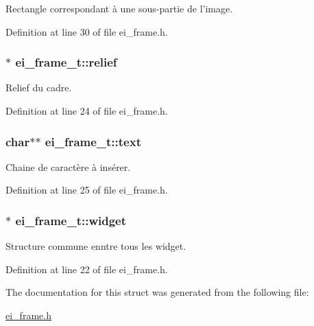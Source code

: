 Rectangle correspondant à une sous-\/partie de l'image. 



Definition at line 30 of file ei\-\_\-frame.\-h.

\hypertarget{structei__frame__t_ae547648681fd8fdf017041d60387ab3d}{
\subsubsection[{relief}]{$\ast$ ei\-\_\-frame\-\_\-t\-::relief}}\label{structei__frame__t_ae547648681fd8fdf017041d60387ab3d}


Relief du cadre. 



Definition at line 24 of file ei\-\_\-frame.\-h.

\hypertarget{structei__frame__t_a17c0d110f2f3fe98e566d7ac3769786b}{
\subsubsection[{text}]{\setlength{\rightskip}{0pt plus 5cm}char$\ast$$\ast$ ei\-\_\-frame\-\_\-t\-::text}}\label{structei__frame__t_a17c0d110f2f3fe98e566d7ac3769786b}


Chaine de caractère à insérer. 



Definition at line 25 of file ei\-\_\-frame.\-h.

\hypertarget{structei__frame__t_abf750a1ddbd97ebb9c641396205aab2e}{
\subsubsection[{widget}]{$\ast$ ei\-\_\-frame\-\_\-t\-::widget}}\label{structei__frame__t_abf750a1ddbd97ebb9c641396205aab2e}


Structure commune enntre tous les widget. 



Definition at line 22 of file ei\-\_\-frame.\-h.



The documentation for this struct was generated from the following file\-:\begin{DoxyCompactItemize}
\item 
\hyperlink{ei__frame_8h}{ei\-\_\-frame.\-h}\end{DoxyCompactItemize}
